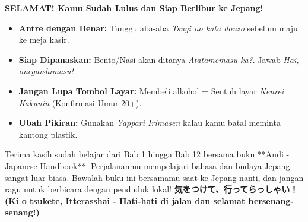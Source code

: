 \vspace{2em}
\begin{tcolorbox}[
    colback=blue!5!white,
    colframe=blue!80!black,
    boxrule=3pt,
    arc=5mm,
    title={\huge\bfseries \sffamily 🌟 Rangkuman Kelulusan Panduan Jepang! 🌟},
    fonttitle=\color{white},
    attach boxed title to top center={yshift=-4mm},
    boxed title style={colback=blue!80!black, rounded corners},
    left=5mm, right=5mm, top=7mm, bottom=5mm
]
\Large \textbf{SELAMAT! Kamu Sudah Lulus dan Siap Berlibur ke Jepang!}
\begin{itemize}
    \item \textbf{Antre dengan Benar:} Tunggu aba-aba \textit{Tsugi no kata douzo} sebelum maju ke meja kasir.
    \item \textbf{Siap Dipanaskan:} Bento/Nasi akan ditanya \textit{Atatamemasu ka?}. Jawab \textit{Hai, onegaishimasu!}
    \item \textbf{Jangan Lupa Tombol Layar:} Membeli alkohol = Sentuh layar \textit{Nenrei Kakunin} (Konfirmasi Umur 20+).
    \item \textbf{Ubah Pikiran:} Gunakan \textit{Yappari Irimasen} kalau kamu batal meminta kantong plastik.
\end{itemize}

Terima kasih sudah belajar dari Bab 1 hingga Bab 12 bersama buku **Andi - Japanese Handbook**. Perjalananmu mempelajari bahasa dan budaya Jepang sangat luar biasa. Bawalah buku ini bersamamu saat ke Jepang nanti, dan jangan ragu untuk berbicara dengan penduduk lokal! \textbf{気をつけて、行ってらっしゃい！ (Ki o tsukete, Itterasshai - Hati-hati di jalan dan selamat bersenang-senang!)}
\end{tcolorbox}

\newpage